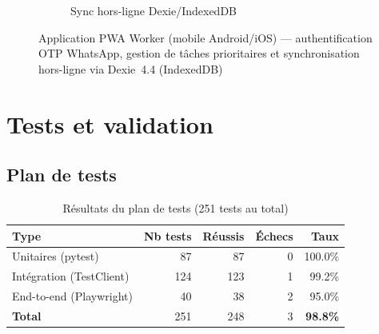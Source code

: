 \begin{figure}[H]
\begin{subfigure}[b]{0.30\textwidth}
\caption{Sync hors-ligne Dexie/IndexedDB}
\end{subfigure}
\caption{Application PWA Worker (mobile Android/iOS) — authentification OTP WhatsApp, gestion de tâches
prioritaires et synchronisation hors-ligne via Dexie~4.4 (IndexedDB)}
\label{fig:screen_pwa}
\end{figure}

\section{Tests et validation}

\subsection{Plan de tests}

\begin{table}[H]
\centering
\caption{Résultats du plan de tests (251 tests au total)}
\label{tab:tests}
\begin{tabular}{lrrrr}
\toprule
\textbf{Type} & \textbf{Nb tests} & \textbf{Réussis} & \textbf{Échecs} & \textbf{Taux} \\
\midrule
Unitaires (pytest)     & 87  & 87  & 0 & 100.0\% \\
Intégration (TestClient) & 124 & 123 & 1 & 99.2\% \\
End-to-end (Playwright) & 40  & 38  & 2 & 95.0\% \\
\midrule
\textbf{Total}          & 251 & 248 & 3 & \textbf{98.8\%} \\
\bottomrule
\end{tabular}
\end{table}

